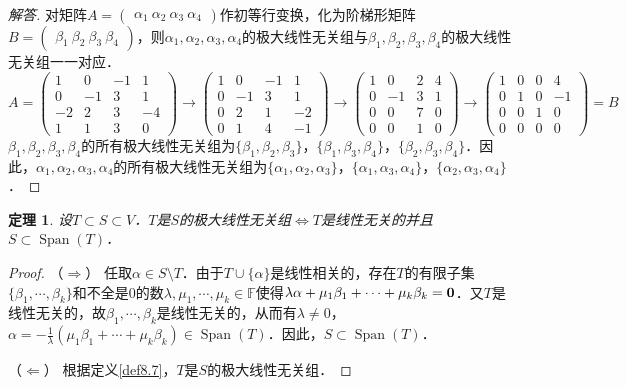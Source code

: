 \documentclass[a4paper,fontset=windows]{ctexbook}
\newtheorem{theorem}{定理}[chapter]
\theoremstyle{definition}
\DeclareMathOperator{\Span}{Span}
\begin{document}
\begin{proof}[解答]
对矩阵$A=\begin{pmatrix}\alpha_1~\alpha_2~\alpha_3~\alpha_4\end{pmatrix}$作初等行变换，化为阶梯形矩阵$B=\begin{pmatrix}\beta_1~\beta_2~\beta_3~\beta_4\end{pmatrix}$，则$\alpha_1,\alpha_2,\alpha_3,\alpha_4$的极大线性无关组与$\beta_1,\beta_2,\beta_3,\beta_4$的极大线性无关组一一对应．
$$A=\begin{pmatrix}1&0&-1&1 \\ 0&-1&3&1 \\ -2&2&3&-4 \\ 1&1&3&0\end{pmatrix}\to\begin{pmatrix}1&0&-1&1 \\ 0&-1&3&1 \\ 0&2&1&-2 \\ 0&1&4&-1\end{pmatrix}\to\begin{pmatrix}1&0&2&4 \\ 0&-1&3&1 \\ 0&0&7&0 \\ 0&0&1&0\end{pmatrix}\to\begin{pmatrix}1&0&0&4 \\ 0&1&0&-1 \\ 0&0&1&0 \\ 0&0&0&0\end{pmatrix}=B$$
$\beta_1,\beta_2,\beta_3,\beta_4$的所有极大线性无关组为$\{\beta_1,\beta_2,\beta_3\}$，$\{\beta_1,\beta_3,\beta_4\}$，$\{\beta_2,\beta_3,\beta_4\}$．因此，$\alpha_1,\alpha_2,\alpha_3,\alpha_4$的所有极大线性无关组为$\{\alpha_1,\alpha_2,\alpha_3\}$，$\{\alpha_1,\alpha_3,\alpha_4\}$，$\{\alpha_2,\alpha_3,\alpha_4\}$．
\end{proof}

\begin{theorem}\label{thm8.9}
设$T\subset S\subset V$．$T$是$S$的极大线性无关组$\Leftrightarrow T$是线性无关的并且$S\subset\Span(T)$．
\end{theorem}

\begin{proof}
（$\Rightarrow$） 任取$\alpha\in S\setminus T$．由于$T\cup\{\alpha\}$是线性相关的，存在$T$的有限子集$\{\beta_1,\cdots,\beta_k\}$和不全是0的数$\lambda,\mu_1,\cdots,\mu_k\in\mathbb{F}$使得$\lambda\alpha+\mu_1\beta_1+\cdots+\mu_k\beta_k={\bf 0}$．又$T$是线性无关的，故$\beta_1,\cdots,\beta_k$是线性无关的，从而有$\lambda\ne 0$，$\alpha=-\frac{1}{\lambda}(\mu_1\beta_1+\cdots+\mu_k\beta_k)\in\Span(T)$．因此，$S\subset\Span(T)$．

（$\Leftarrow$） 根据定义\ref{def8.7}，$T$是$S$的极大线性无关组．
\end{proof}
\end{document}
